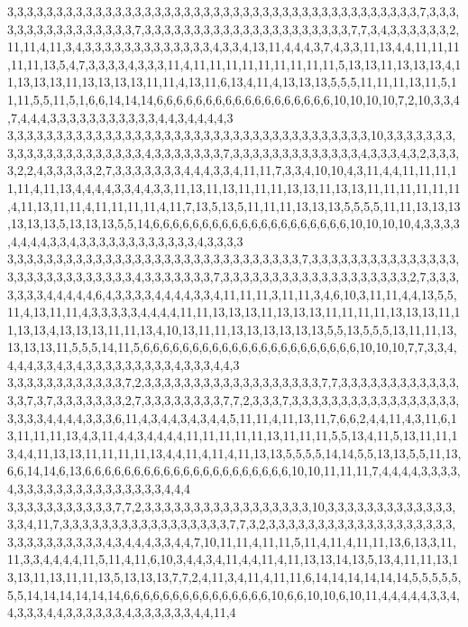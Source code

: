3,3,3,3,3,3,3,3,3,3,3,3,3,3,3,3,3,3,3,3,3,3,3,3,3,3,3,3,3,3,3,3,3,3,3,3,3,3,3,3,3,3,7,3,3,3,3,3,3,3,3,3,3,3,3,3,3,3,3,7,3,3,3,3,3,3,3,3,3,3,3,3,3,3,3,3,3,3,3,3,3,7,7,3,4,3,3,3,3,3,3,2,11,11,4,11,3,4,3,3,3,3,3,3,3,3,3,3,3,3,3,4,3,3,4,13,11,4,4,4,3,7,4,3,3,11,13,4,4,11,11,11,11,11,13,5,4,7,3,3,3,3,4,3,3,3,11,4,11,11,11,11,11,11,11,11,11,5,13,13,11,13,13,13,4,11,13,13,13,11,13,13,13,13,11,11,4,13,11,6,13,4,11,4,13,13,13,5,5,5,11,11,11,13,11,5,11,11,5,5,11,5,1,6,6,14,14,14,6,6,6,6,6,6,6,6,6,6,6,6,6,6,6,6,6,6,10,10,10,10,7,2,10,3,3,4,7,4,4,4,3,3,3,3,3,3,3,3,3,3,3,4,4,3,4,4,4,4,3
3,3,3,3,3,3,3,3,3,3,3,3,3,3,3,3,3,3,3,3,3,3,3,3,3,3,3,3,3,3,3,3,3,3,3,3,3,10,3,3,3,3,3,3,3,3,3,3,3,3,3,3,3,3,3,3,3,3,3,4,3,3,3,3,3,3,3,7,3,3,3,3,3,3,3,3,3,3,3,3,3,4,3,3,3,4,3,2,3,3,3,3,2,2,4,3,3,3,3,3,2,7,3,3,3,3,3,3,3,4,4,4,3,3,4,11,11,7,3,3,4,10,10,4,3,11,4,4,11,11,11,11,11,4,11,13,4,4,4,4,3,3,4,4,3,3,11,13,11,13,11,11,11,13,13,11,13,13,11,11,11,11,11,11,4,11,13,11,11,4,11,11,11,11,4,11,7,13,5,13,5,11,11,11,13,13,13,5,5,5,5,11,11,13,13,13,13,13,13,5,13,13,13,5,5,14,6,6,6,6,6,6,6,6,6,6,6,6,6,6,6,6,6,6,6,6,10,10,10,10,4,3,3,3,3,4,4,4,4,3,3,4,3,3,3,3,3,3,3,3,3,3,3,3,4,3,3,3,3
3,3,3,3,3,3,3,3,3,3,3,3,3,3,3,3,3,3,3,3,3,3,3,3,3,3,3,3,3,3,7,3,3,3,3,3,3,3,3,3,3,3,3,3,3,3,3,3,3,3,3,3,3,3,3,3,3,3,3,4,3,3,3,3,3,3,3,7,3,3,3,3,3,3,3,3,3,3,3,3,3,3,3,3,3,3,3,2,7,3,3,3,3,3,3,3,4,4,4,4,4,6,4,3,3,3,3,4,4,4,4,3,3,4,11,11,11,3,11,11,3,4,6,10,3,11,11,4,4,13,5,5,11,4,13,11,11,4,3,3,3,3,3,4,4,4,4,11,11,13,13,13,11,13,13,13,11,11,11,11,13,13,13,11,11,13,13,4,13,13,13,11,11,13,4,10,13,11,11,13,13,13,13,13,13,5,5,13,5,5,5,13,11,11,13,13,13,13,11,5,5,5,14,11,5,6,6,6,6,6,6,6,6,6,6,6,6,6,6,6,6,6,6,6,6,6,6,10,10,10,7,7,3,3,4,4,4,4,3,3,4,3,4,3,3,3,3,3,3,3,3,3,4,3,3,3,4,4,3
3,3,3,3,3,3,3,3,3,3,3,3,7,2,3,3,3,3,3,3,3,3,3,3,3,3,3,3,3,3,3,3,7,7,3,3,3,3,3,3,3,3,3,3,3,3,3,3,7,3,7,3,3,3,3,3,3,3,2,7,3,3,3,3,3,3,3,3,7,7,2,3,3,3,7,3,3,3,3,3,3,3,3,3,3,3,3,3,3,3,3,3,3,3,3,3,4,4,4,4,3,3,3,6,11,4,3,4,4,3,4,3,4,4,5,11,11,4,11,13,11,7,6,6,2,4,4,11,4,3,11,6,13,11,11,11,13,4,3,11,4,4,3,4,4,4,4,11,11,11,11,11,13,11,11,11,5,5,13,4,11,5,13,11,11,13,4,4,11,13,13,11,11,11,11,13,4,4,11,4,11,4,11,13,13,5,5,5,5,14,14,5,5,13,13,5,5,11,13,6,6,14,14,6,13,6,6,6,6,6,6,6,6,6,6,6,6,6,6,6,6,6,6,6,6,6,10,10,11,11,11,7,4,4,4,4,3,3,3,3,4,3,3,3,3,3,3,3,3,3,3,3,3,3,3,3,4,4,4
3,3,3,3,3,3,3,3,3,3,3,7,7,2,3,3,3,3,3,3,3,3,3,3,3,3,3,3,3,3,3,10,3,3,3,3,3,3,3,3,3,3,3,3,3,3,3,4,11,7,3,3,3,3,3,3,3,3,3,3,3,3,3,3,3,3,3,7,7,3,2,3,3,3,3,3,3,3,3,3,3,3,3,3,3,3,3,3,3,3,3,3,3,3,3,3,3,3,3,3,4,3,4,4,4,3,3,4,4,7,10,11,11,4,11,11,5,11,4,11,4,11,11,13,6,13,3,11,11,3,3,4,4,4,4,11,5,11,4,11,6,10,3,4,4,3,4,11,4,4,11,4,11,13,13,14,13,5,13,4,11,11,13,13,13,11,13,11,11,13,5,13,13,13,7,7,2,4,11,3,4,11,4,11,11,6,14,14,14,14,14,14,5,5,5,5,5,5,5,14,14,14,14,14,14,6,6,6,6,6,6,6,6,6,6,6,6,6,6,6,10,6,6,10,10,6,10,11,4,4,4,4,4,3,3,4,4,3,3,3,4,4,3,3,3,3,3,3,4,3,3,3,3,3,3,4,4,11,4
